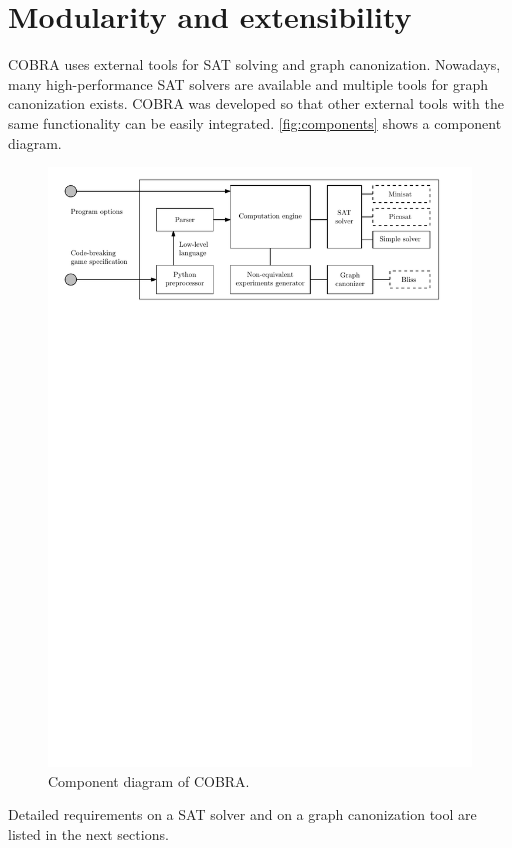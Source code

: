 \section{Modularity and extensibility}

COBRA uses external tools for SAT solving and graph canonization.
Nowadays, many high-performance SAT solvers are available
  and multiple tools for graph canonization exists.
COBRA was developed so that other external tools with the same functionality
  can be easily integrated.
\autoref{fig:components} shows a component diagram.
\begin{figure}[h]
\includegraphics[width=\textwidth]{pictures/modularity.pdf}
\caption{Component diagram of COBRA.}
\label{fig:components}
\end{figure}

Detailed requirements on a SAT solver and
  on a graph canonization tool are listed in the next sections.

